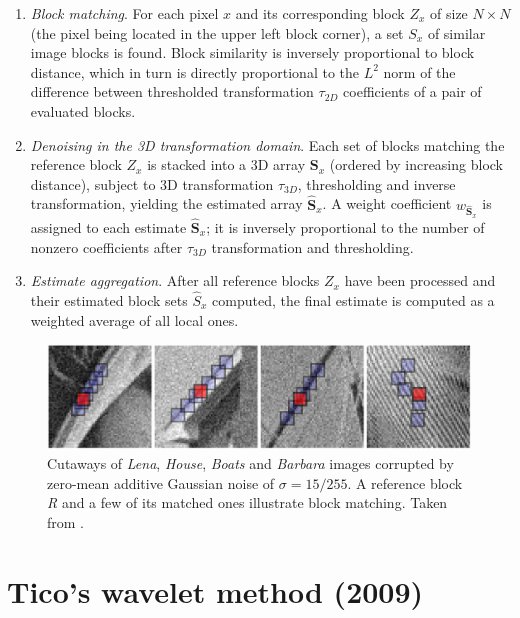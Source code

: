 \documentclass[12pt,notitlepage]{report}
\begin{document}
\begin{enumerate}
	\item {\em Block matching}. For each pixel $x$ and its corresponding block $Z_x$ of size $N \times N$ (the pixel being located in the upper left block corner), a set $S_x$ of similar image blocks is found. Block similarity is inversely proportional to block distance, which in turn is directly proportional to the $L^2$ norm of the difference between thresholded transformation $\tau_{2D}$ coefficients of a pair of evaluated blocks.
	\item {\em Denoising in the 3D transformation domain}. Each set of blocks matching the reference block $Z_x$ is stacked into a 3D array $\mathbf{S}_x$ (ordered by increasing block distance), subject to 3D transformation $\tau_{3D}$, thresholding and inverse transformation, yielding the estimated array $\hat{\mathbf{S}}_x$. A weight coefficient $w_{\hat{\mathbf{S}}_x}$ is assigned to each estimate $\hat{\mathbf{S}}_x$; it is inversely proportional to the number of nonzero coefficients after $\tau_{3D}$ transformation and thresholding.   
	\item {\em Estimate aggregation}. After all reference blocks $Z_x$ have been processed and their estimated block sets $\hat{S}_x$ computed, the final estimate is computed as a weighted average of all local ones.
\end{enumerate}
\begin{figure}[htb]
 \begin{center}
  \includegraphics[width=12cm]{bm3d_matching_blocks.png}
 \end{center}
 \caption{Cutaways of {\em Lena}, {\em House}, {\em Boats} and {\em Barbara} images corrupted by zero-mean additive Gaussian noise of $\sigma = 15/255$. A reference block {\em R} and a few of its matched ones illustrate block matching. Taken from \cite{bm3d}.}
 \label{fig:bm3d_example}
\end{figure}

\section{Tico's wavelet method (2009)}
\label{sec:tico09}
\end{document}
